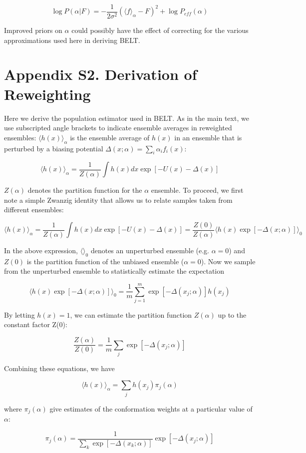 \documentclass[12pt]{article}
\begin{document}
$$\log P(\alpha | F) = -\frac{1}{2\sigma^2} (\langle f \rangle_\alpha - F)^2 + \log P_{eff}(\alpha)$$

Improved priors on $\alpha$ could possibly have the effect of correcting for the various approximations used here in deriving BELT.   

\section*{Appendix S2.  Derivation of Reweighting}

Here we derive the population estimator used in BELT.  As in the main text, we use subscripted angle brackets to indicate ensemble averages in reweighted ensembles: $\langle h(x)\rangle _\alpha$ is the ensemble average of $h(x)$ in an ensemble that is perturbed by a biasing potential $\Delta (x;\alpha) = \sum_i \alpha_i f_i(x)$:

$$\langle h(x)\rangle _\alpha = \frac{1}{Z(\alpha)} \int h(x) dx \exp[ -U(x) - \Delta(x)]$$

$Z(\alpha)$ denotes the partition function for the $\alpha$ ensemble.  To proceed, we first note a simple Zwanzig identity that allows us to relate samples taken from different ensembles:

$$\langle h(x)\rangle _\alpha = \frac{1}{Z(\alpha)} \int h(x) dx \exp[ -U(x) - \Delta(x)] = \frac{Z(0)}{Z(\alpha)} \langle h(x) \exp[-\Delta(x;\alpha)]\rangle _0 $$

In the above expression, $\langle \rangle_0$ denotes an unperturbed ensemble (e.g. $\alpha = 0$) and $Z(0)$ is the partition function of the unbiased ensemble ($\alpha = 0$).  Now we sample from the unperturbed ensemble to statistically estimate the expectation

$$\langle h(x) \exp[-\Delta(x;\alpha)]\rangle _0 = \frac{1}{m} \sum_{j = 1}^{m} \exp [ - \Delta(x_j;\alpha)] h(x_j)$$

By letting $h(x) = 1$, we can estimate the partition function $Z(\alpha)$ up to the constant factor Z(0):

$$ \frac{Z(\alpha)}{Z(0)} = \frac{1}{m} \sum_j \exp[-\Delta(x_j;\alpha)]$$

Combining these equations, we have

$$\langle h(x)\rangle _\alpha = \sum_j h(x_j) \pi_j(\alpha)$$

where $\pi_j(\alpha)$ give estimates of the conformation weights at a particular value of $\alpha$:

$$\pi_j(\alpha) = \frac{1}{\sum_k \exp[-\Delta(x_k;\alpha)]} \exp[-\Delta(x_j;\alpha)]$$
\end{document}
